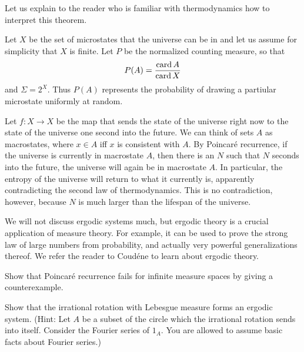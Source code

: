 \begin{subsec}
Let us explain to the reader who is familiar with thermodynamics how to interpret this theorem.

Let $X$ be the set of microstates that the universe can be in and let us assume for simplicity that $X$ is finite.
Let $P$ be the normalized counting measure, so that
\[P(A) = \frac{\operatorname{card} A}{\operatorname{card} X}\]
and $\Sigma = 2^X$.
Thus $P(A)$ represents the probability of drawing a partiular microstate uniformly at random.

Let $f: X \to X$ be the map that sends the state of the universe right now to the state of the universe one second into the future.
We can think of sets $A$ as macrostates, where $x \in A$ iff $x$ is consistent with $A$.
By Poincar\'e recurrence, if the universe is currently in macrostate $A$, then there is an $N$ such that $N$ seconds into the future, the universe will again be in macrostate $A$.
In particular, the entropy of the universe will return to what it currently is, apparently contradicting the second law of thermodynamics.
This is no contradiction, however, because $N$ is much larger than the lifespan of the universe.
\end{subsec}

\begin{subsec}
We will not discuss ergodic systems much, but ergodic theory is a crucial application of measure theory.
For example, it can be used to prove the strong law of large numbers from probability, and actually very powerful generalizations thereof.
We refer the reader to Coud\'ene \cite{coudène2016ergodic} to learn about ergodic theory.
\end{subsec}

\begin{exercise}
Show that Poincar\'e recurrence fails for infinite measure spaces by giving a counterexample.
\end{exercise}

\begin{exercise}
\label{irrational rotation exercise}
Show that the irrational rotation with Lebesgue measure forms an ergodic system.
(Hint: Let $A$ be a subset of the circle which the irrational rotation sends into itself. Consider the Fourier series of $1_A$. You are allowed to assume basic facts about Fourier series.)
\end{exercise}

